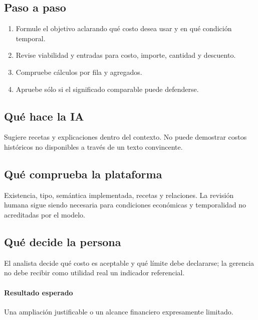 \subsection{Paso a paso}
\begin{enumerate}
\item Formule el objetivo aclarando qué costo desea usar y en qué condición temporal.\par\nopagebreak[4]
\item Revise viabilidad y entradas para costo, importe, cantidad y descuento.\par\nopagebreak[4]
\item Compruebe cálculos por fila y agregados.\par\nopagebreak[4]
\item Apruebe sólo si el significado comparable puede defenderse.\par\nopagebreak[4]
\end{enumerate}
\subsection{Qué hace la IA}
Sugiere recetas y explicaciones dentro del contexto. No puede demostrar costos históricos no disponibles a través de un texto convincente.

\subsection{Qué comprueba la plataforma}
Existencia, tipo, semántica implementada, recetas y relaciones. La revisión humana sigue siendo necesaria para condiciones económicas y temporalidad no acreditadas por el modelo.

\subsection{Qué decide la persona}
El analista decide qué costo es aceptable y qué límite debe declararse; la gerencia no debe recibir como utilidad real un indicador referencial.

\paragraph{Resultado esperado} Una ampliación justificable o un alcance financiero expresamente limitado.

